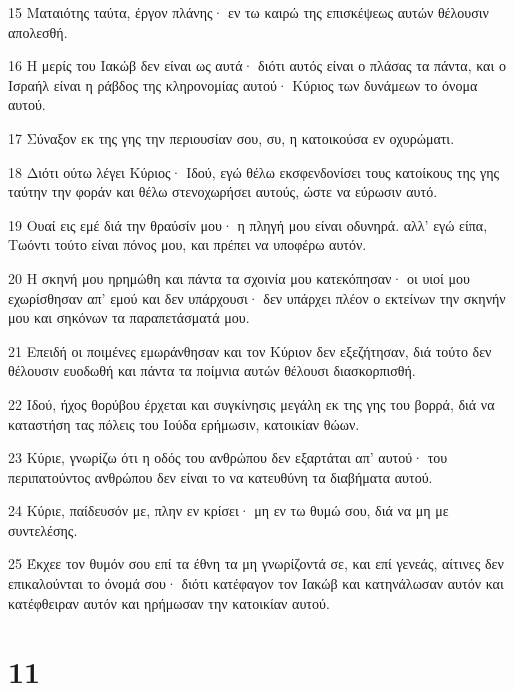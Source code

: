 \par 15 Ματαιότης ταύτα, έργον πλάνης· εν τω καιρώ της επισκέψεως αυτών θέλουσιν απολεσθή.
\par 16 Η μερίς του Ιακώβ δεν είναι ως αυτά· διότι αυτός είναι ο πλάσας τα πάντα, και ο Ισραήλ είναι η ράβδος της κληρονομίας αυτού· Κύριος των δυνάμεων το όνομα αυτού.
\par 17 Σύναξον εκ της γης την περιουσίαν σου, συ, η κατοικούσα εν οχυρώματι.
\par 18 Διότι ούτω λέγει Κύριος· Ιδού, εγώ θέλω εκσφενδονίσει τους κατοίκους της γης ταύτην την φοράν και θέλω στενοχωρήσει αυτούς, ώστε να εύρωσιν αυτό.
\par 19 Ουαί εις εμέ διά την θραύσίν μου· η πληγή μου είναι οδυνηρά. αλλ' εγώ είπα, Τωόντι τούτο είναι πόνος μου, και πρέπει να υποφέρω αυτόν.
\par 20 Η σκηνή μου ηρημώθη και πάντα τα σχοινία μου κατεκόπησαν· οι υιοί μου εχωρίσθησαν απ' εμού και δεν υπάρχουσι· δεν υπάρχει πλέον ο εκτείνων την σκηνήν μου και σηκόνων τα παραπετάσματά μου.
\par 21 Επειδή οι ποιμένες εμωράνθησαν και τον Κύριον δεν εξεζήτησαν, διά τούτο δεν θέλουσιν ευοδωθή και πάντα τα ποίμνια αυτών θέλουσι διασκορπισθή.
\par 22 Ιδού, ήχος θορύβου έρχεται και συγκίνησις μεγάλη εκ της γης του βορρά, διά να καταστήση τας πόλεις του Ιούδα ερήμωσιν, κατοικίαν θώων.
\par 23 Κύριε, γνωρίζω ότι η οδός του ανθρώπου δεν εξαρτάται απ' αυτού· του περιπατούντος ανθρώπου δεν είναι το να κατευθύνη τα διαβήματα αυτού.
\par 24 Κύριε, παίδευσόν με, πλην εν κρίσει· μη εν τω θυμώ σου, διά να μη με συντελέσης.
\par 25 Έκχεε τον θυμόν σου επί τα έθνη τα μη γνωρίζοντά σε, και επί γενεάς, αίτινες δεν επικαλούνται το όνομά σου· διότι κατέφαγον τον Ιακώβ και κατηνάλωσαν αυτόν και κατέφθειραν αυτόν και ηρήμωσαν την κατοικίαν αυτού.

\chapter{11}

